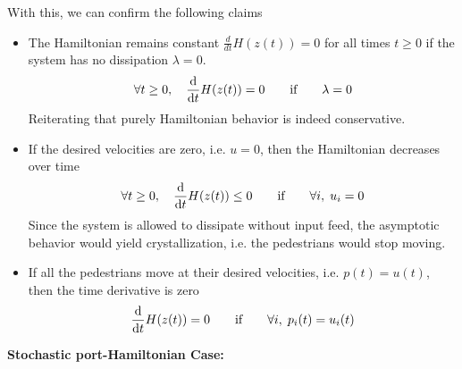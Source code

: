 With this, we can confirm the following claims
\begin{itemize}
    \item The Hamiltonian remains constant $\frac{d}{dt}H(z(t)) = 0$ for all times $t \geq 0$ if the system has no dissipation $\lambda = 0$. 
    \begin{align*}
        \forall t \geq 0,\quad \dfrac{\mathrm d }{\mathrm d t}H(z(t)) = 0 \qquad \text{if} \qquad \lambda = 0
    \end{align*}
    Reiterating that purely Hamiltonian behavior is indeed conservative.
    \item If the desired velocities are zero, i.e. $u = 0$, then the Hamiltonian decreases over time
    \begin{align*}
        \forall t \geq 0,\quad \dfrac{\mathrm d }{\mathrm d t}H(z(t)) \leq 0 \qquad \text{if} \qquad \forall i,\; u_i = 0
    \end{align*}
    Since the system is allowed to dissipate without input feed, the asymptotic behavior would yield crystallization, i.e. the pedestrians would stop moving.
    \item If all the pedestrians move at their desired velocities, i.e. $p(t) = u(t)$, then the time derivative is zero
    \begin{align*}
        \dfrac{\mathrm d }{\mathrm d t} H(z(t)) = 0 \qquad \text{if} \qquad \forall i,\; p_i(t) = u_i(t)
    \end{align*}
\end{itemize}

\textbf{Stochastic port-Hamiltonian Case:}

